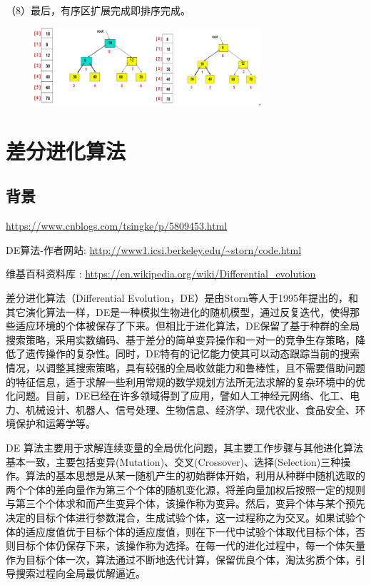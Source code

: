 （8）最后，有序区扩展完成即排序完成。
\begin{figure}[h]
\begin{center}
\includegraphics[width=0.75\textwidth]{pictures/2012113021482583.png}
\end{center}
\end{figure}




\chapter{差分进化算法}
\section{背景}
\url{https://www.cnblogs.com/tsingke/p/5809453.html}

DE算法-作者网站: \url{http://www1.icsi.berkeley.edu/~storn/code.html}

维基百科资料库  : \url{https://en.wikipedia.org/wiki/Differential_evolution}

差分进化算法（Differential Evolution，DE）是由Storn等人于1995年提出的，和其它演化算法一样，DE是一种模拟生物进化的随机模型，通过反复迭代，使得那些适应环境的个体被保存了下来。但相比于进化算法，DE保留了基于种群的全局搜索策略，采用实数编码、基于差分的简单变异操作和一对一的竞争生存策略，降低了遗传操作的复杂性。同时，DE特有的记忆能力使其可以动态跟踪当前的搜索情况，以调整其搜索策略，具有较强的全局收敛能力和鲁棒性，且不需要借助问题的特征信息，适于求解一些利用常规的数学规划方法所无法求解的复杂环境中的优化问题。目前，DE已经在许多领域得到了应用，譬如人工神经元网络、化工、电力、机械设计、机器人、信号处理、生物信息、经济学、现代农业、食品安全、环境保护和运筹学等。
 
 
DE 算法主要用于求解连续变量的全局优化问题，其主要工作步骤与其他进化算法基本一致，主要包括变异(Mutation)、交叉(Crossover)、选择(Selection)三种操作。算法的基本思想是从某一随机产生的初始群体开始，利用从种群中随机选取的两个个体的差向量作为第三个个体的随机变化源，将差向量加权后按照一定的规则与第三个个体求和而产生变异个体，该操作称为变异。然后，变异个体与某个预先决定的目标个体进行参数混合，生成试验个体，这一过程称之为交叉。如果试验个体的适应度值优于目标个体的适应度值，则在下一代中试验个体取代目标个体，否则目标个体仍保存下来，该操作称为选择。在每一代的进化过程中，每一个体矢量作为目标个体一次，算法通过不断地迭代计算，保留优良个体，淘汰劣质个体，引导搜索过程向全局最优解逼近。


